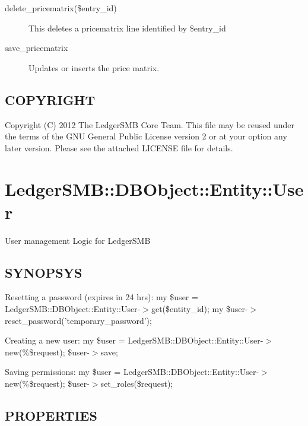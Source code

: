 \begin{description}
\begin{description}
\begin{description}
\begin{description}
\begin{description}
\begin{description}
\begin{description}
\begin{description}
\begin{description}
\item[{delete\_pricematrix(\$entry\_id)}] \mbox{}

This deletes a pricematrix line identified by \$entry\_id


\item[{save\_pricematrix}] \mbox{}

Updates or inserts the price matrix.

\end{description}
\subsection*{COPYRIGHT\label{LedgerSMB::DBObject::Entity::Credit_Account_COPYRIGHT}}


Copyright (C) 2012 The LedgerSMB Core Team. This file may be reused under the 
terms of the GNU General Public License version 2 or at your option any later 
version.  Please see the attached LICENSE file for details.

\section{LedgerSMB::DBObject::Entity::User\label{LedgerSMB::DBObject::Entity::User}}


User management Logic for LedgerSMB

\subsection*{SYNOPSYS\label{LedgerSMB::DBObject::Entity::User_SYNOPSYS}}


Resetting a password (expires in 24 hrs):
  my \$user = LedgerSMB::DBObject::Entity::User-$>$get(\$entity\_id);
  my \$user-$>$reset\_password('temporary\_password');



Creating a new user:
  my \$user = LedgerSMB::DBObject::Entity::User-$>$new(\%\$request); 
  \$user-$>$save;



Saving permissions:
  my \$user = LedgerSMB::DBObject::Entity::User-$>$new(\%\$request);
  \$user-$>$set\_roles(\$request);

\subsection*{PROPERTIES\label{LedgerSMB::DBObject::Entity::User_PROPERTIES}}
\begin{description}


\end{description}
\end{description}
\end{description}
\end{description}
\end{description}
\end{description}
\end{description}
\end{description}
\end{description}
